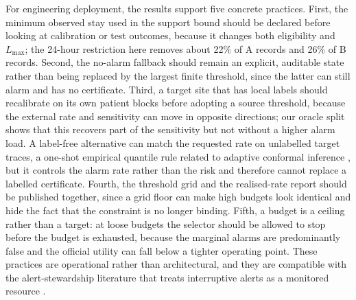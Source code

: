 For engineering deployment, the results support five concrete practices. First, the minimum observed stay used in the support bound should be declared before looking at calibration or test outcomes, because it changes both eligibility and $L_{\max}$; the 24-hour restriction here removes about 22\% of A records and 26\% of B records. Second, the no-alarm fallback should remain an explicit, auditable state rather than being replaced by the largest finite threshold, since the latter can still alarm and has no certificate. Third, a target site that has local labels should recalibrate on its own patient blocks before adopting a source threshold, because the external rate and sensitivity can move in opposite directions; our oracle split shows that this recovers part of the sensitivity but not without a higher alarm load. A label-free alternative can match the requested rate on unlabelled target traces, a one-shot empirical quantile rule related to adaptive conformal inference \citep{gibbs2021adaptive}, but it controls the alarm rate rather than the risk and therefore cannot replace a labelled certificate. Fourth, the threshold grid and the realised-rate report should be published together, since a grid floor can make high budgets look identical and hide the fact that the constraint is no longer binding. Fifth, a budget is a ceiling rather than a target: at loose budgets the selector should be allowed to stop before the budget is exhausted, because the marginal alarms are predominantly false and the official utility can fall below a tighter operating point. These practices are operational rather than architectural, and they are compatible with the alert-stewardship literature that treats interruptive alerts as a monitored resource \citep{khan2026qualitative,ray2026alert,jaidev2026sepsis}.

